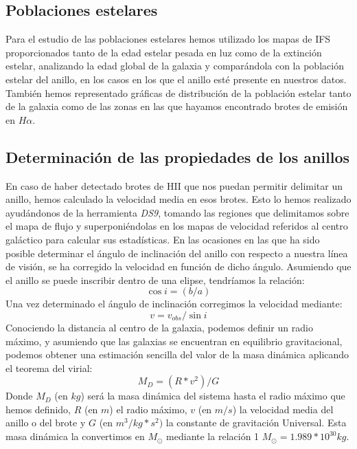 \documentclass{article}
\newcommand{\hal}{$H\alpha$}
\begin{document}
\subsection{Poblaciones estelares}
Para el estudio de las poblaciones estelares hemos utilizado los mapas de IFS proporcionados tanto de la edad estelar pesada en luz como de la extinción estelar, analizando la edad global de la galaxia y comparándola con la población estelar del anillo, en los casos en los que el anillo esté presente en nuestros datos. También hemos representado gráficas de distribución de la población estelar tanto de la galaxia como de las zonas en las que hayamos encontrado brotes de emisión en \hal. 
\subsection{Determinación de las propiedades de los anillos}
En caso de haber detectado brotes de HII que nos puedan permitir delimitar un anillo, hemos calculado la velocidad media en esos brotes. Esto lo hemos realizado ayudándonos de la herramienta \emph{DS9}, tomando las regiones que delimitamos sobre el mapa de flujo y superponiéndolas en los mapas de velocidad referidos al centro galáctico para calcular sus estadísticas. 
En las ocasiones en las que ha sido posible determinar el ángulo de inclinación del anillo con respecto a nuestra línea de visión, se ha corregido la velocidad en función de dicho ángulo. Asumiendo que el anillo se puede inscribir dentro de una elipse, tendríamos la relación:
\begin{equation}
\cos i=(b/a) \label{ecuacion_2}
\end{equation}
Una vez determinado el ángulo de inclinación corregimos la velocidad mediante:
\begin{equation}
v=v_{obs}/\sin i \label{ecuacion_3}
\end{equation}
Conociendo la distancia al centro de la galaxia, podemos definir un radio máximo, y asumiendo que las galaxias se encuentran en equilibrio gravitacional, podemos obtener una estimación sencilla del valor de la masa dinámica aplicando el teorema del virial:
\begin{equation}
M_{D}=(R*v^{2})/G \label{ecuacion_4}
\end{equation}
Donde $M_{D}$ (en $kg$) será la masa dinámica del sistema hasta el radio máximo que hemos definido, $R$ (en $m$) el radio máximo, $v$ (en $m/s$) la velocidad media del anillo o del brote y $G$ (en $m^{3}/kg*s^{2})$ la constante de gravitación Universal. Esta masa dinámica la convertimos en $M_{\odot}$ mediante la relación 1 $M_{\odot} = 1.989 * 10^{30} kg$.
\end{document}
